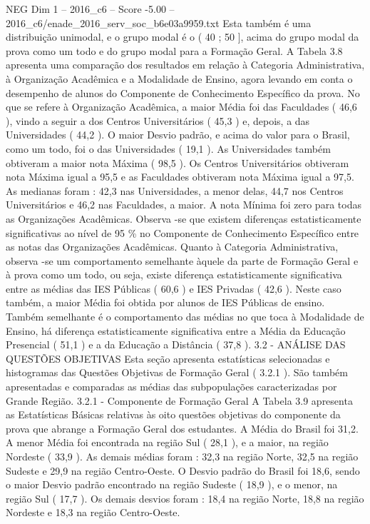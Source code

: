 \begin{textsample}{NEG Dim 1 – 2016\_c6 – Score -5.00 – 2016\_c6/enade\_2016\_serv\_soc\_b6e03a9959.txt}
Esta também é uma distribuição unimodal, e o grupo modal é o ( 40 ; 50 ], acima do grupo modal da prova como um todo e do grupo modal para a Formação Geral.
A Tabela 3.8 apresenta uma comparação dos resultados em relação à Categoria Administrativa, à Organização Acadêmica e a Modalidade de Ensino, agora levando em conta o desempenho de alunos do Componente de Conhecimento Específico da prova.
No que se refere à Organização Acadêmica, a maior Média foi das Faculdades ( 46,6 ), vindo a seguir a dos Centros Universitários ( 45,3 ) e, depois, a das Universidades ( 44,2 ).
O maior Desvio padrão, e acima do valor para o Brasil, como um todo, foi o das Universidades ( 19,1 ).
As Universidades também obtiveram a maior nota Máxima ( 98,5 ).
Os Centros Universitários obtiveram nota Máxima igual a 95,5 e as Faculdades obtiveram nota Máxima igual a 97,5.
As medianas foram : 42,3 nas Universidades, a menor delas, 44,7 nos Centros Universitários e 46,2 nas Faculdades, a maior.
A nota Mínima foi zero para todas as Organizações Acadêmicas.
Observa -se que existem diferenças estatisticamente significativas ao nível de 95 \% no Componente de Conhecimento Específico entre as notas das Organizações Acadêmicas.
Quanto à Categoria Administrativa, observa -se um comportamento semelhante àquele da parte de Formação Geral e à prova como um todo, ou seja, existe diferença estatisticamente significativa entre as médias das IES Públicas ( 60,6 ) e IES Privadas ( 42,6 ).
Neste caso também, a maior Média foi obtida por alunos de IES Públicas de ensino.
Também semelhante é o comportamento das médias no que toca à Modalidade de Ensino, há diferença estatisticamente significativa entre a Média da Educação Presencial ( 51,1 ) e a da Educação a Distância ( 37,8 ). 3.2 - ANÁLISE DAS QUESTÕES OBJETIVAS Esta seção apresenta estatísticas selecionadas e histogramas das Questões Objetivas de Formação Geral ( 3.2.1 ).
São também apresentadas e comparadas as médias das subpopulações caracterizadas por Grande Região. 3.2.1 - Componente de Formação Geral A Tabela 3.9 apresenta as Estatísticas Básicas relativas às oito questões objetivas do componente da prova que abrange a Formação Geral dos estudantes.
A Média do Brasil foi 31,2.
A menor Média foi encontrada na região Sul ( 28,1 ), e a maior, na região Nordeste ( 33,9 ).
As demais médias foram : 32,3 na região Norte, 32,5 na região Sudeste e 29,9 na região Centro-Oeste.
O Desvio padrão do Brasil foi 18,6, sendo o maior Desvio padrão encontrado na região Sudeste ( 18,9 ), e o menor, na região Sul ( 17,7 ).
Os demais desvios foram : 18,4 na região Norte, 18,8 na região Nordeste e 18,3 na região Centro-Oeste.

\end{textsample}
